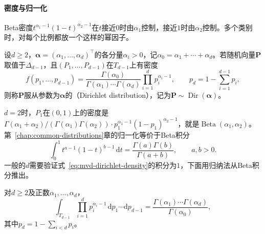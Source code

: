 \paragraph{密度与归一化}
Beta密度$t^{\alpha_1-1}(1-t)^{\alpha_2-1}$在$t$接近$0$时由$\alpha_1$控制，接近$1$时由$\alpha_2$控制。多个类别时，对每个比例都放一个这样的幂因子。

\begin{definition}[Dirichlet分布]
\label{def:mvd-dirichlet}
设$d\geq2$，$\bm{\alpha}=(\alpha_1,\ldots,\alpha_d)^{\top}$的各分量$\alpha_i>0$，记$\alpha_0=\alpha_1+\cdots+\alpha_d$。若随机向量$\bm{P}$取值于$\Delta_{d-1}$，且$(P_1,\ldots,P_{d-1})$在$T_{d-1}$上有密度
\begin{equation}
 f(p_1,\ldots,p_{d-1})=\frac{\Gamma(\alpha_0)}{\Gamma(\alpha_1)\cdots\Gamma(\alpha_d)}\prod_{i=1}^{d}p_i^{\alpha_i-1},\qquad p_d=1-\sum_{i=1}^{d-1}p_i ,
 \label{eq:mvd-dirichlet-density}
\end{equation}
则称$\bm{P}$服从参数为$\bm{\alpha}$的（Dirichlet distribution），记为$\bm{P}\sim\operatorname{Dir}(\bm{\alpha})$。
\end{definition}

$d=2$时，$P_1$在$(0,1)$上的密度是$\Gamma(\alpha_1+\alpha_2)/(\Gamma(\alpha_1)\Gamma(\alpha_2))\cdot p_1^{\alpha_1-1}(1-p_1)^{\alpha_2-1}$，就是$\operatorname{Beta}(\alpha_1,\alpha_2)$。第~\ref{chap:common-distributions}章的归一化等价于Beta积分
\[
 \int_0^{1}t^{a-1}(1-t)^{b-1}\,\mathrm{d}t=\frac{\Gamma(a)\Gamma(b)}{\Gamma(a+b)},\qquad a,b>0 .
\]
一般的$d$需要验证式~\eqref{eq:mvd-dirichlet-density}的积分为$1$，下面用归纳法从Beta积分推出。

\begin{lemma}[Dirichlet积分]
\label{lem:mvd-dirichlet-integral}
对$d\geq2$及正数$\alpha_1,\ldots,\alpha_d$，
\begin{equation}
 \int_{T_{d-1}}\prod_{i=1}^{d}p_i^{\alpha_i-1}\,\mathrm{d}p_1\cdots\mathrm{d}p_{d-1}=\frac{\Gamma(\alpha_1)\cdots\Gamma(\alpha_d)}{\Gamma(\alpha_0)} ,
 \label{eq:mvd-dirichlet-integral}
\end{equation}
其中$p_d=1-\sum_{i<d}p_i$。
\end{lemma}

